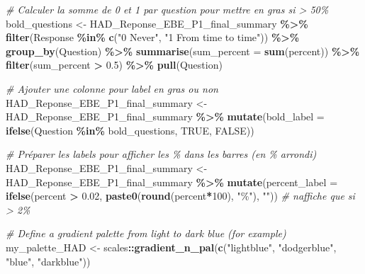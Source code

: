 \documentclass[
]{article}
\newenvironment{Shaded}{\begin{snugshade}}{\end{snugshade}}
\newcommand{\AttributeTok}[1]{\textcolor[rgb]{0.13,0.29,0.53}{#1}}
\newcommand{\CommentTok}[1]{\textcolor[rgb]{0.56,0.35,0.01}{\textit{#1}}}
\newcommand{\ConstantTok}[1]{\textcolor[rgb]{0.56,0.35,0.01}{#1}}
\newcommand{\DecValTok}[1]{\textcolor[rgb]{0.00,0.00,0.81}{#1}}
\newcommand{\FloatTok}[1]{\textcolor[rgb]{0.00,0.00,0.81}{#1}}
\newcommand{\FunctionTok}[1]{\textcolor[rgb]{0.13,0.29,0.53}{\textbf{#1}}}
\newcommand{\NormalTok}[1]{#1}
\newcommand{\OtherTok}[1]{\textcolor[rgb]{0.56,0.35,0.01}{#1}}
\newcommand{\SpecialCharTok}[1]{\textcolor[rgb]{0.81,0.36,0.00}{\textbf{#1}}}
\newcommand{\StringTok}[1]{\textcolor[rgb]{0.31,0.60,0.02}{#1}}
\begin{document}
\begin{Shaded}
\begin{Highlighting}[]
\CommentTok{\# Calculer la somme de 0 et 1 par question pour mettre en gras si \textgreater{} 50\%}
\NormalTok{bold\_questions }\OtherTok{\textless{}{-}}\NormalTok{ HAD\_Reponse\_EBE\_P1\_final\_summary }\SpecialCharTok{\%\textgreater{}\%}
  \FunctionTok{filter}\NormalTok{(Response }\SpecialCharTok{\%in\%} \FunctionTok{c}\NormalTok{(}\StringTok{"0 Never"}\NormalTok{, }\StringTok{"1 From time to time"}\NormalTok{)) }\SpecialCharTok{\%\textgreater{}\%}
  \FunctionTok{group\_by}\NormalTok{(Question) }\SpecialCharTok{\%\textgreater{}\%}
  \FunctionTok{summarise}\NormalTok{(}\AttributeTok{sum\_percent =} \FunctionTok{sum}\NormalTok{(percent)) }\SpecialCharTok{\%\textgreater{}\%}
  \FunctionTok{filter}\NormalTok{(sum\_percent }\SpecialCharTok{\textgreater{}} \FloatTok{0.5}\NormalTok{) }\SpecialCharTok{\%\textgreater{}\%}
  \FunctionTok{pull}\NormalTok{(Question)}

\CommentTok{\# Ajouter une colonne pour label en gras ou non}
\NormalTok{HAD\_Reponse\_EBE\_P1\_final\_summary }\OtherTok{\textless{}{-}}\NormalTok{ HAD\_Reponse\_EBE\_P1\_final\_summary }\SpecialCharTok{\%\textgreater{}\%}
  \FunctionTok{mutate}\NormalTok{(}\AttributeTok{bold\_label =} \FunctionTok{ifelse}\NormalTok{(Question }\SpecialCharTok{\%in\%}\NormalTok{ bold\_questions, }\ConstantTok{TRUE}\NormalTok{, }\ConstantTok{FALSE}\NormalTok{))}

\CommentTok{\# Préparer les labels pour afficher les \% dans les barres (en \% arrondi)}
\NormalTok{HAD\_Reponse\_EBE\_P1\_final\_summary }\OtherTok{\textless{}{-}}\NormalTok{ HAD\_Reponse\_EBE\_P1\_final\_summary }\SpecialCharTok{\%\textgreater{}\%}
  \FunctionTok{mutate}\NormalTok{(}\AttributeTok{percent\_label =} \FunctionTok{ifelse}\NormalTok{(percent }\SpecialCharTok{\textgreater{}} \FloatTok{0.02}\NormalTok{, }\FunctionTok{paste0}\NormalTok{(}\FunctionTok{round}\NormalTok{(percent}\SpecialCharTok{*}\DecValTok{100}\NormalTok{), }\StringTok{"\%"}\NormalTok{), }\StringTok{""}\NormalTok{))  }\CommentTok{\# n\textquotesingle{}affiche que si \textgreater{} 2\%}



\CommentTok{\# Define a gradient palette from light to dark blue (for example)}
\NormalTok{my\_palette\_HAD }\OtherTok{\textless{}{-}}\NormalTok{ scales}\SpecialCharTok{::}\FunctionTok{gradient\_n\_pal}\NormalTok{(}\FunctionTok{c}\NormalTok{(}\StringTok{"lightblue"}\NormalTok{, }\StringTok{"dodgerblue"}\NormalTok{, }\StringTok{"blue"}\NormalTok{, }\StringTok{"darkblue"}\NormalTok{))}


\end{Highlighting}
\end{Shaded}
\end{document}
